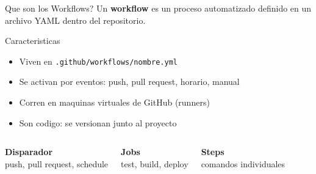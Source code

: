 \documentclass[aspectratio=169]{beamer}
\begin{document}
\begin{frame}{Que son los Workflows?}
  Un \textbf{workflow} es un proceso automatizado definido en un archivo YAML dentro del repositorio.

  \vspace{0.3cm}

  \begin{block}{Caracteristicas}
    \begin{itemize}
      \item Viven en \texttt{.github/workflows/nombre.yml}
      \item Se activan por eventos: push, pull request, horario, manual
      \item Corren en maquinas virtuales de GitHub (runners)
      \item Son codigo: se versionan junto al proyecto
    \end{itemize}
  \end{block}

  \vspace{0.3cm}

  \begin{columns}
    \begin{center}
      \textbf{Disparador}\\[0.2cm]
      {\small push, pull request, schedule}
    \end{center}

    \begin{center}
      \textbf{Jobs}\\[0.2cm]
      {\small test, build, deploy}
    \end{center}

    \begin{center}
      \textbf{Steps}\\[0.2cm]
      {\small comandos individuales}
    \end{center}
  \end{columns}
\end{frame}
\end{document}
